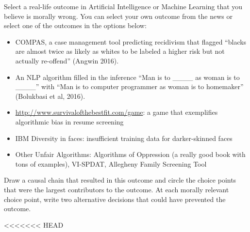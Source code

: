 \documentclass[submit]{harvardml}
\begin{document}
\begin{problem}

Select a real-life outcome in Artificial Intelligence or Machine Learning 
that you believe is morally wrong. You can select your own outcome from 
the news or select one of the outcomes in the options below:

\begin{itemize}
    \item COMPAS, a case management tool predicting recidivism that 
        flagged “blacks are almost twice as likely as whites to be 
        labeled a higher risk but not actually re-offend” (Angwin 
        2016).
        
    \item An NLP algorithm filled in the inference “Man is to 
        \_\_\_\_ as woman is to \_\_\_\_” with “Man is 
        to computer programmer as woman is to homemaker” (Bolukbasi 
        et al, 2016).
        
    \item \url{http://www.survivalofthebestfit.com/game}: a game that 
        exemplifies algorithmic bias in resume screening
        
    \item IBM Diversity in faces: insufficient training data for 
        darker-skinned faces
        
    \item Other Unfair Algorithms: Algorithms of Oppression (a really 
        good book with tons of examples), VI-SPDAT, Allegheny Family 
        Screening Tool
        
\end{itemize}
Draw a causal chain that resulted in this outcome and circle the choice points that were the largest contributors to the outcome. At each morally relevant choice point, write two alternative decisions that could have prevented the outcome.

\end{problem}

<<<<<<< HEAD
\end{document}
